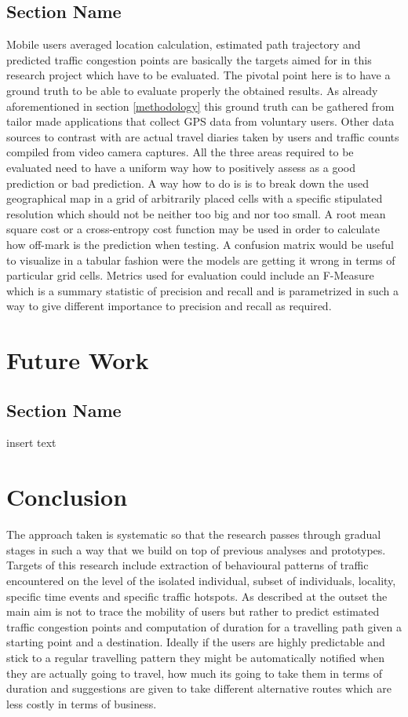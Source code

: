 \documentclass[12pt, a4paper]{report}
\theoremstyle{definition}
\theoremstyle{definition}%
\theoremstyle{definition}%
\theoremstyle{definition}%
\theoremstyle{definition}%
\theoremstyle{definition}%
\begin{document}
\section{Section Name}
Mobile users averaged location calculation, estimated path trajectory and predicted traffic congestion points are basically the targets aimed for in this research project which have to be evaluated. The pivotal point here is to have a ground truth to be able to evaluate properly the obtained results. As already aforementioned in section \ref{methodology} this ground truth can be gathered from tailor made applications that collect GPS data from voluntary users. Other data sources to contrast with are actual travel diaries taken by users and traffic counts compiled from video camera captures.
All the three areas required to be evaluated need to have a uniform way how to positively assess as a good prediction or bad prediction. A way how to do is is to break down the used geographical map in a grid of arbitrarily placed cells with a specific stipulated resolution which should not be neither too big and nor too small. A root mean square cost or a cross-entropy cost function may be used in order to calculate how off-mark is the prediction when testing. A confusion matrix would be useful to visualize in a tabular fashion were the models are getting it wrong in terms of particular grid cells. Metrics used for evaluation could include an F-Measure which is a summary statistic of precision and recall and is parametrized in such a way to give different importance to precision and recall as required.

\chapter{Future Work}
\section{Section Name}
insert text

\chapter{Conclusion}
 The approach taken is systematic so that the research passes through gradual stages in such a way that we build on top of previous analyses and prototypes. Targets of this research include extraction of behavioural patterns of traffic encountered on the level of the isolated individual, subset of individuals, locality, specific time events and specific traffic hotspots. As described at the outset the main aim is not to trace the mobility of users but rather to predict estimated traffic congestion points and computation of duration for a travelling path given a starting point and a destination. Ideally if the users are highly predictable and stick to a regular travelling pattern they might be automatically notified when they are actually going to travel, how much its going to take them in terms of duration and suggestions are given to take different alternative routes which are less costly in terms of business. 
\end{document}
